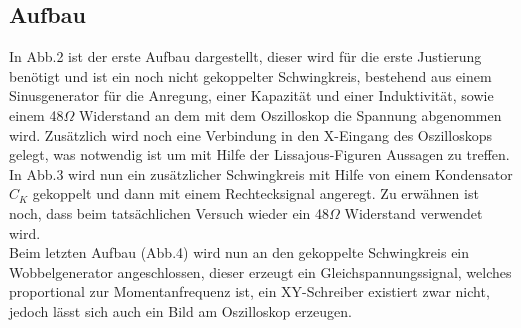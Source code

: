 \subsection{Aufbau}
In Abb.2 ist der erste Aufbau dargestellt, dieser wird für die erste Justierung benötigt und ist ein noch nicht gekoppelter Schwingkreis, bestehend aus einem Sinusgenerator für die Anregung, einer Kapazität und einer Induktivität, sowie einem 48$\Omega$ Widerstand an dem mit dem Oszilloskop die Spannung abgenommen wird. Zusätzlich wird noch eine Verbindung in den X-Eingang des Oszilloskops gelegt, was notwendig ist um mit Hilfe der Lissajous-Figuren Aussagen zu treffen. \\
In Abb.3 wird nun ein zusätzlicher Schwingkreis mit Hilfe von einem Kondensator $C_K$ gekoppelt und dann mit einem Rechtecksignal angeregt. Zu erwähnen ist noch, dass beim tatsächlichen Versuch wieder ein 48$\Omega$ Widerstand verwendet wird. \\
Beim letzten Aufbau (Abb.4) wird nun an den gekoppelte Schwingkreis ein Wobbelgenerator angeschlossen, dieser erzeugt ein Gleichspannungssignal, welches proportional zur Momentanfrequenz ist, ein XY-Schreiber existiert zwar nicht, jedoch lässt sich auch ein Bild am Oszilloskop erzeugen.

